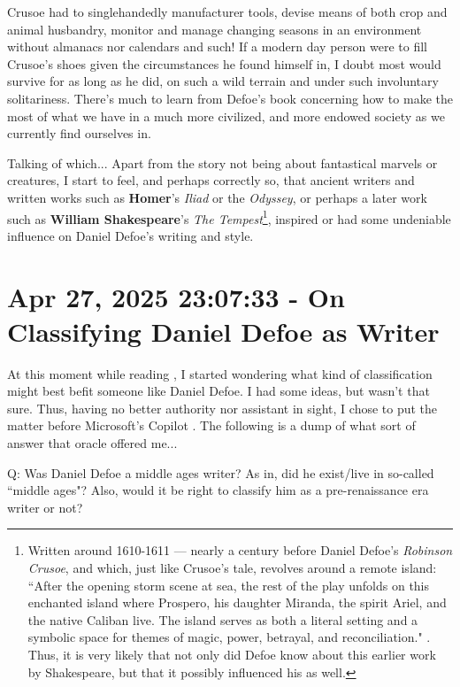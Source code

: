 \documentclass[a4paper]{article}
\begin{document}
Crusoe had to singlehandedly manufacturer tools, devise means of both crop and animal husbandry, monitor and manage changing seasons in an environment without almanacs nor calendars and such! If a modern day person were to fill Crusoe's shoes given the circumstances he found himself in, I doubt most would survive for as long as he did, on such a wild terrain and under such involuntary solitariness. There's much to learn from Defoe's book concerning how to make the most of what we have in a much more civilized, and more endowed society as we currently find ourselves in.

Talking of which... Apart from the story not being about fantastical marvels or creatures, I start to feel, and perhaps correctly so, that ancient writers and written works such as \textbf{Homer}'s \textit{Iliad} or the \textit{Odyssey}, or perhaps a later work such as \textbf{William Shakespeare}'s \textit{The Tempest}\footnote{Written around 1610-1611 --- nearly a century before Daniel Defoe's \textit{Robinson Crusoe}, and which, just like Crusoe's tale, revolves around a remote island: ``After the opening storm scene at sea, the rest of the play unfolds on this enchanted island where Prospero, his daughter Miranda, the spirit Ariel, and the native Caliban live. The island serves as both a literal setting and a symbolic space for themes of magic, power, betrayal, and reconciliation." \cite{copilot_assistant}. Thus, it is very likely that not only did Defoe know about this earlier work by Shakespeare, but that it possibly influenced his as well.}, inspired or had some undeniable influence on Daniel Defoe's writing and style.






\section{Apr 27, 2025 23:07:33 - On Classifying Daniel Defoe as Writer }
\label{SEC21}

At this moment while reading \cite{Defoe2007}, I started wondering what kind of classification might best befit someone like Daniel Defoe. I had some ideas, but wasn't that sure. Thus, having no better authority nor assistant in sight, I chose to put the matter before Microsoft's Copilot \cite{copilot_assistant}. The following is a dump of what sort of answer that oracle offered me...

{
\Large

Q: Was Daniel Defoe a middle ages writer? As in, did he exist/live in so-called ``middle ages"? Also, would it be right to classify him as a pre-renaissance era writer or not?

}
\end{document}
